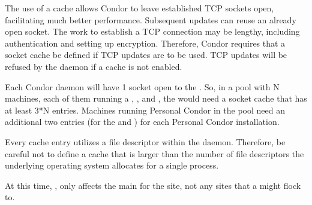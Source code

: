 The use of a cache allows Condor to leave established TCP sockets open,
facilitating much better performance.
Subsequent updates can reuse an already open socket.
The work to establish a TCP connection may be lengthy,
including authentication and setting up encryption.
Therefore, Condor requires that
a socket cache be defined if TCP updates are to be used.
TCP updates will be refused by the  daemon
if a cache is not enabled.

Each Condor daemon will have 1 socket open to the .
So, in a pool with N machines, each of them running a ,
, and , the  would
need a socket cache that has at least 3*N entries.
Machines running Personal Condor in the pool need
an additional two entries (for the  and
) for each Personal Condor installation.

Every cache entry utilizes a file descriptor within the
 daemon.
Therefore, be careful not to define a cache that
is larger than the number of file descriptors the underlying operating
system allocates for a single process.

\Note At this time, , only
affects the main  for the site, not any sites that
a  might flock to.

